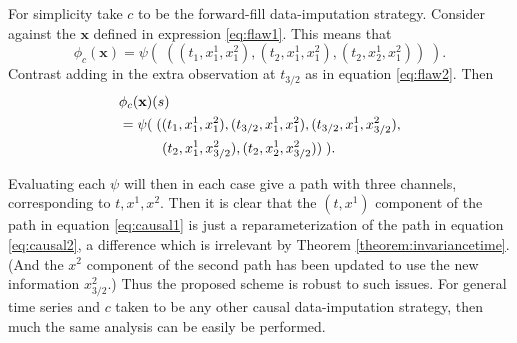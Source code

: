\documentclass{article}
\begin{document}
For simplicity take $c$ to be the forward-fill data-imputation strategy. Consider against the $\mathbf{x}$ defined in expression \eqref{eq:flaw1}. This means that
\begin{equation}\label{eq:causal1}
    \phi_c(\mathbf{x}) = \psi(\;((t_1, x_1^1, x_1^2), (t_2, x_1^1, x_1^2), (t_2, x_2^1, x_1^2))\;).
\end{equation}
Contrast adding in the extra observation at $t_{3/2}$ as in equation \eqref{eq:flaw2}. Then
\begin{align}
    &\phi_c(\mathbf{x})(s)\nonumber\\
    &=\psi(\;((t_1, x_1^1, x_1^2), (t_{3/2}, x_1^1, x_1^2), (t_{3/2}, x_1^1, x_{3/2}^2),\nonumber\\ &\hspace{3.1em}(t_2, x_1^1, x_{3/2}^2), (t_2, x_2^1, x_{3/2}^2))\;).\label{eq:causal2}
\end{align}

Evaluating each $\psi$ will then in each case give a path with three channels, corresponding to $t, x^1, x^2$. Then it is clear that the $(t, x^1)$ component of the path in equation \eqref{eq:causal1} is just a reparameterization of the path in equation \eqref{eq:causal2}, a difference which is irrelevant by Theorem \ref{theorem:invariancetime}. (And the $x^2$ component of the second path has been updated to use the new information $x_{3/2}^2$.) Thus the proposed scheme is robust to such issues. For general time series and $c$ taken to be any other causal data-imputation strategy, then much the same analysis can be easily be performed.
\end{document}
